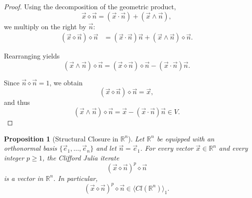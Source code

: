 \documentclass{amsart}
\theoremstyle{plain}
\newtheorem{proposition}{Proposition}
\numberwithin{equation}{section}
\begin{document}
\begin{proof}
Using the decomposition of the geometric product,
\[
\vec x \diamond \vec n
=
(\vec x \cdot \vec n) + (\vec x \wedge \vec n),
\]
we multiply on the right by $\vec n$:
\begin{align*}
(\vec x \diamond \vec n)\diamond \vec n
&=
(\vec x \cdot \vec n)\vec n
+
(\vec x \wedge \vec n)\diamond \vec n.
\end{align*}

Rearranging yields
\[
(\vec x \wedge \vec n)\diamond \vec n
=
(\vec x \diamond \vec n)\diamond \vec n
-
(\vec x \cdot \vec n)\vec n.
\]

Since $\vec n \diamond \vec n = 1$, we obtain
\[
(\vec x \diamond \vec n)\diamond \vec n = \vec x,
\]
and thus
\[
(\vec x \wedge \vec n)\diamond \vec n
=
\vec x - (\vec x \cdot \vec n)\vec n \in V.
\]
\end{proof}

\begin{proposition}[Structural Closure in $\mathbb{R}^n$]
Let $\mathbb{R}^n$ be equipped with an orthonormal basis
$\{\vec e_1,\dots,\vec e_n\}$ and let $\vec n = \vec e_1$.
For every vector $\vec x \in \mathbb{R}^n$ and every integer $p \ge 1$,
the Clifford Julia iterate
\[
(\vec x \diamond \vec n)^p \diamond \vec n
\]
is a vector in $\mathbb{R}^n$.
In particular,
\[
(\vec x \diamond \vec n)^p \diamond \vec n \in \langle Cl(\mathbb{R}^n)\rangle_1.
\]
\end{proposition}
\end{document}
